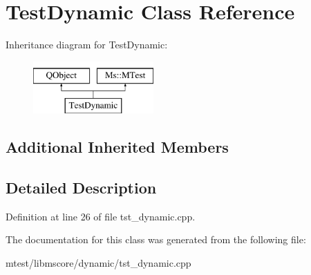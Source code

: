 \hypertarget{class_test_dynamic}{}\section{Test\+Dynamic Class Reference}
\label{class_test_dynamic}
Inheritance diagram for Test\+Dynamic\+:\begin{figure}[H]
\begin{center}
\leavevmode
\includegraphics[height=2.000000cm]{class_test_dynamic}
\end{center}
\end{figure}
\subsection*{Additional Inherited Members}


\subsection{Detailed Description}


Definition at line 26 of file tst\+\_\+dynamic.\+cpp.



The documentation for this class was generated from the following file\+:\begin{DoxyCompactItemize}
\item 
mtest/libmscore/dynamic/tst\+\_\+dynamic.\+cpp\end{DoxyCompactItemize}
